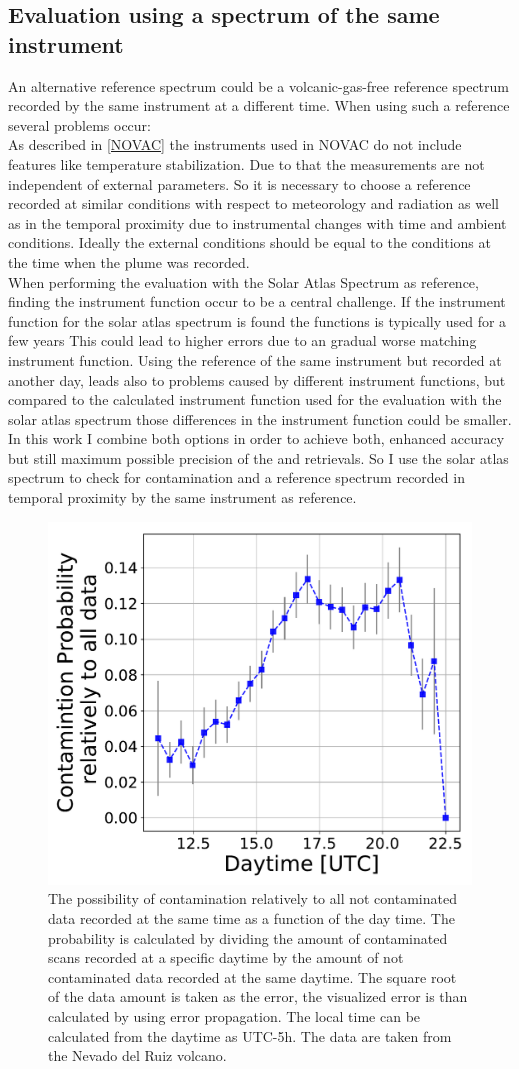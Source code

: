 \subsection*{Evaluation using a spectrum of the same instrument}
An alternative reference spectrum could be a volcanic-gas-free reference
spectrum recorded by the same instrument at a different time. When using such a reference several problems occur:\\
As described in \cref{NOVAC} the instruments used in NOVAC do not include features like temperature stabilization. Due to that the measurements are not independent of external parameters. 
So it is necessary to choose a reference recorded at similar conditions with respect to meteorology and	radiation as well as in the temporal proximity due to instrumental changes with time and ambient conditions. Ideally the external conditions should be equal to the conditions at the time when the plume was recorded.\\
%
When performing the evaluation with the Solar Atlas Spectrum as reference, finding the instrument function occur to be a central challenge. If the instrument function for the solar atlas spectrum is found the functions is typically used for a few years This could lead to higher errors due to an gradual worse matching instrument function.
Using the reference of the same instrument but recorded at another day, leads also to problems caused by different instrument functions, but compared to the calculated instrument function used for the evaluation with the solar atlas spectrum those differences in the instrument function could be smaller.
\\
In this work I combine both options in order to
achieve both, enhanced accuracy but still maximum possible precision of
the  and  retrievals. So I use the solar atlas spectrum to check for 
contamination and a reference spectrum recorded in temporal proximity by the same instrument as reference.\\
\begin{figure}
\centering
\includegraphics[width=0.5\linewidth]{Bilder/ConProb}
\caption{The possibility of contamination relatively to all not contaminated data recorded at the same time as a function of the day time. The probability is calculated by dividing the amount of contaminated scans recorded at a specific daytime by the amount of not contaminated data recorded at the same daytime. The square root of the data amount is taken as the error, the visualized error is than calculated by using error propagation. The local time can be calculated from the daytime as UTC-5h. The data are taken from the Nevado del Ruiz volcano.}
\label{fig:conprob}
\end{figure}

